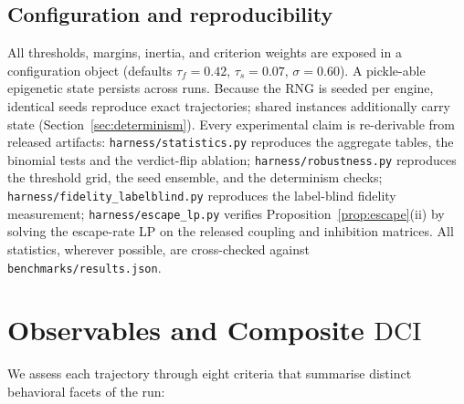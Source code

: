 \documentclass[journal]{IEEEtran}
\newcommand{\DCI}{\mathrm{DCI}}
\begin{document}
\subsection{Configuration and reproducibility}
All thresholds, margins, inertia, and criterion weights are exposed in a
configuration object (defaults $\tau_f=0.42$, $\tau_s=0.07$, $\sigma=0.60$).
A pickle-able epigenetic state persists across runs. Because the RNG is
seeded per engine, identical seeds reproduce exact trajectories; shared
instances additionally carry state (Section~\ref{sec:determinism}).
Every experimental claim is re-derivable from released artifacts:
\texttt{harness/statistics.py} reproduces the aggregate tables, the
binomial tests and the verdict-flip ablation; \texttt{harness/robustness.py}
reproduces the threshold grid, the seed ensemble, and the determinism
checks; \texttt{harness/fidelity\_labelblind.py} reproduces the
label-blind fidelity measurement; \texttt{harness/escape\_lp.py}
verifies Proposition~\ref{prop:escape}(ii) by solving the escape-rate
LP on the released coupling and inhibition matrices. All statistics,
wherever possible, are cross-checked against
\texttt{benchmarks/results.json}.

\section{Observables and Composite $\DCI$}
\label{sec:criterias}

We assess each trajectory through eight criteria that
summarise distinct behavioral facets of the run:
\end{document}
